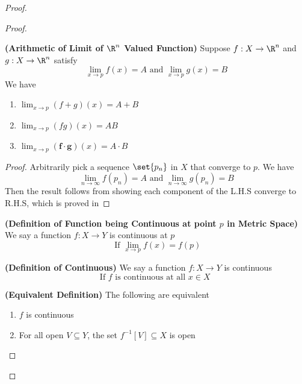 \documentclass{report}
\begin{document}
\begin{proof}
\begin{proof}
\begin{theorem}
\label{3.11.5}
\textbf{(Arithmetic of Limit of $\R^n$ Valued Function)} Suppose  $f:X\rightarrow \R^n$ and $g:X\rightarrow \R^n$ satisfy
\begin{equation*}
\lim_{x\to p}f(x)=A\text{ and }\lim_{x\to p}g(x)=B
\end{equation*}
We have
\begin{enumerate}[label=(\alph*)]
  \item $\lim_{x\to p}(f+g)(x)=A+B$ 
  \item $\lim_{x\to p}(fg)(x)=AB$  
  \item $\lim_{x\to p}(\textbf{f}\cdot \textbf{g})(x)=A\cdot B$
\end{enumerate}
\end{theorem}
\begin{proof}
Arbitrarily pick a sequence $\set{p_n}$ in $X$ that converge to  $p$. We have
 \begin{equation*}
\lim_{n\to\infty}f(p_n)=A\text{ and }\lim_{n\to\infty}g(p_n)=B
\end{equation*}
Then the result follows from showing each component of the L.H.S converge to R.H.S, which is proved in 
\end{proof}
\begin{definition}
\label{3.11.6}
\textbf{(Definition of Function being Continuous at point $p$ in Metric Space)} We say a function $f:X\rightarrow Y$ is continuous at $p$ 
\begin{equation*}
\text{ If }\lim_{x\to p}f(x)=f(p)
\end{equation*}
\end{definition}
\begin{definition}
\label{3.11.7}
\textbf{(Definition of Continuous)} We say a function $f:X\rightarrow Y$ is continuous 
\begin{equation*}
\text{ If }f\text{ is continuous at all $x\in X$ }
\end{equation*}
\end{definition}
\begin{theorem}
\label{3.11.8}
\textbf{(Equivalent Definition)} The following are equivalent
\begin{enumerate}[label=(\alph*)]
  \item $f$ is continuous 
  \item For all open $V\subseteq Y$, the set $f^{-1}[V]\subseteq X$ is open

\end{enumerate}
\end{theorem}
\end{proof}
\end{proof}
\end{document}
